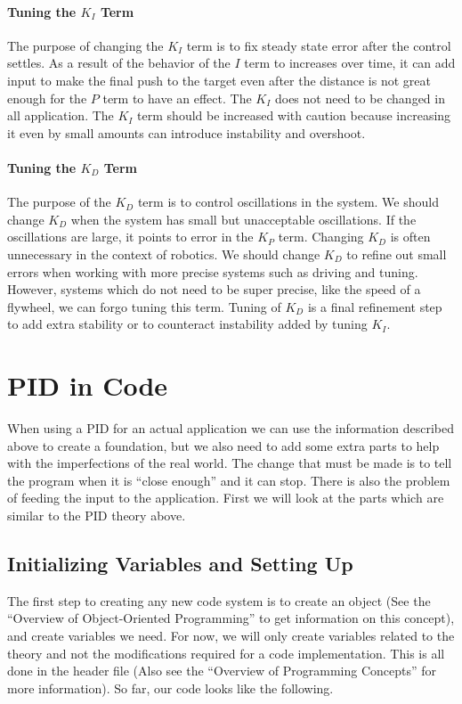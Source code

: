 \documentclass[12pt]{report}
\begin{document}
\paragraph{Tuning the $K_I$ Term}
    The purpose of changing the $K_I$ term is to fix steady state error after the control settles.
    As a result of the behavior of the $I$ term to increases over time, 
        it can add input to make the final push to the target even after the distance is not great enough for the $P$ term to have an effect. 
    The $K_I$ does not need to be changed in all application.
    The $K_I$ term should be increased with caution because increasing it even by small amounts can introduce instability and overshoot.

\paragraph{Tuning the $K_D$ Term}
    The purpose of the $K_D$ term is to control oscillations in the system. We should change $K_D$ when the system has small but unacceptable oscillations. 
    If the oscillations are large, 
        it points to error in the $K_P$ term.
    Changing $K_D$ is often unnecessary in the context of robotics. We should change $K_D$ to refine out small errors when working with more precise systems such as driving and tuning.
    However, systems which do not need to be super precise, like the speed of a flywheel, we can forgo tuning this term. 
    Tuning of $K_D$ is a final refinement step to add extra stability or to counteract instability added by tuning $K_I$.

\newpage
\section{PID in Code}
    When using a PID for an actual application we can use the information described above to create a foundation, but we also need to add some extra parts to help with the imperfections of the real world.
    The change that must be made is to tell the program when it is ``close enough'' and it can stop.
    There is also the problem of feeding the input to the application. 
    First we will look at the parts which are similar to the PID theory above.

\subsection{Initializing Variables and Setting Up}
    The first step to creating any new code system is to create an object (See the ``Overview of Object-Oriented Programming'' to get information on this concept), 
        and create variables we need. 
        For now, we will only create variables related to the theory and not the modifications required for a code implementation. 
        This is all done in the header file (Also see the ``Overview of Programming Concepts'' for more information). So far, our code looks like the following.
\end{document}
